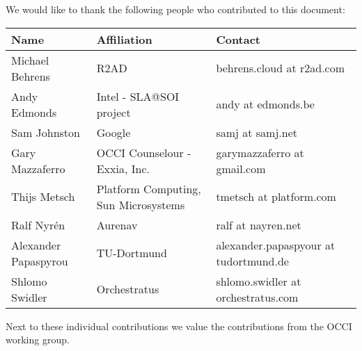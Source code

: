 
We would like to thank the following people who contributed to this
document:

\begin{tabular}{l|p{2in}|p{2in}}
Name & Affiliation & Contact \\
\hline
Michael Behrens & R2AD & behrens.cloud at r2ad.com \\
Andy Edmonds & Intel - SLA@SOI project & andy at edmonds.be \\
Sam Johnston & Google & samj at samj.net \\
Gary Mazzaferro & OCCI Counselour - Exxia, Inc. &  garymazzaferro at gmail.com \\ 
Thijs Metsch & Platform Computing, Sun Microsystems & tmetsch at platform.com \\
Ralf Nyrén & Aurenav & ralf at nayren.net \\
Alexander Papaspyrou & TU-Dortmund & alexander.papaspyour at tu\-dortmund.de \\
Shlomo Swidler & Orchestratus & shlomo.swidler at orchestratus.com \\
\end{tabular}

Next to these individual contributions we value the contributions from
the OCCI working group.


